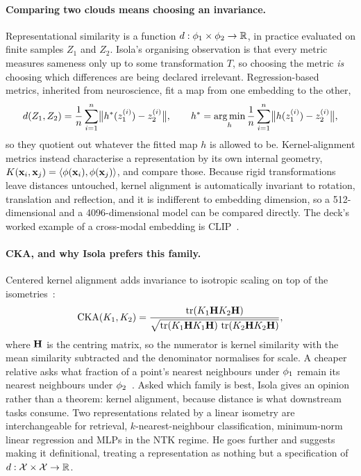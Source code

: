 \paragraph{Comparing two clouds means choosing an invariance.} Representational similarity is
a function $d : \phi_1 \times \phi_2 \to \mathbb{R}$, in practice evaluated on finite samples $Z_1$
and $Z_2$. Isola's organising observation is that every metric measures sameness only up to
some transformation $T$, so choosing the metric \emph{is} choosing which differences are
being declared irrelevant. Regression-based metrics, inherited from neuroscience, fit a map
from one embedding to the other,
\[
  d(Z_1, Z_2) = \frac{1}{n}\sum_{i=1}^{n}
    \bigl\lVert h^{*}(z_1^{(i)}) - z_2^{(i)} \bigr\rVert,
  \qquad
  h^{*} = \operatorname*{arg\,min}_{h} \frac{1}{n}\sum_{i=1}^{n}
    \bigl\lVert h(z_1^{(i)}) - z_2^{(i)} \bigr\rVert,
\]
\noindent so they quotient out whatever the fitted map $h$ is allowed to be. Kernel-alignment metrics
instead characterise a representation by its own internal geometry,
$K(\mathbf{x}_i, \mathbf{x}_j) = \left\langle \phi(\mathbf{x}_i), \phi(\mathbf{x}_j) \right\rangle$, and compare those. Because
rigid transformations leave distances untouched, kernel alignment is automatically invariant
to rotation, translation and reflection, and it is indifferent to embedding dimension, so a
512-dimensional and a 4096-dimensional model can be compared directly. The deck's worked example
of a cross-modal embedding is CLIP~\citep{radford2021clip}.

\paragraph{CKA, and why Isola prefers this family.} Centered kernel alignment adds invariance
to isotropic scaling on top of the isometries~\citep{kornblith2019}:
\[
  \mathrm{CKA}(K_1, K_2)
  = \frac{\operatorname{tr}(K_1 \mathbf{H} K_2 \mathbf{H})}
         {\sqrt{\operatorname{tr}(K_1 \mathbf{H} K_1 \mathbf{H})\,
                \operatorname{tr}(K_2 \mathbf{H} K_2 \mathbf{H})}},
\]
\noindent where $\mathbf{H}$ is the centring matrix, so the numerator is kernel similarity with
the mean similarity subtracted and the denominator normalises for scale. A cheaper relative
asks what fraction of a point's nearest neighbours under $\phi_1$ remain its nearest
neighbours under $\phi_2$~\citep{huh2024}. Asked which family is best, Isola gives an opinion
rather than a theorem: kernel alignment, because distance is what downstream tasks consume.
Two representations related by a linear isometry are interchangeable for retrieval,
$k$-nearest-neighbour classification, minimum-norm linear regression and MLPs in the NTK
regime. He goes further and suggests making it definitional, treating a representation as
nothing but a specification of $d : \mathcal{X} \times \mathcal{X} \to \mathbb{R}$.


